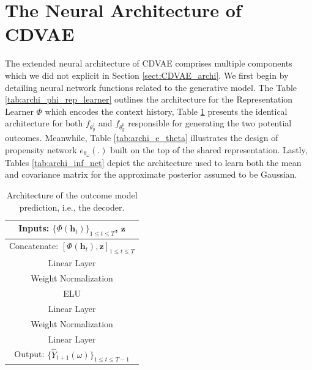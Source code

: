 \documentclass[10pt]{article} %
\begin{document}
\section{The Neural Architecture of CDVAE}
\label{appendix:extended_archi_CDVAE}
The extended neural architecture of CDVAE comprises multiple components which we did not explicit in Section \ref{sect:CDVAE_archi}. We first begin by detailing neural network functions related to the generative model. The Table \ref{tab:archi_phi_rep_learner} outlines the architecture for the Representation Learner $\Phi$ which encodes the context history, Table \ref{tab:archi_f_theta} presents the identical architecture for both $f_{\theta_{y}^1}$ and $f_{\theta_{y}^0}$ responsible for generating the two potential outcomes. Meanwhile, Table \ref{tab:archi_e_theta} illustrates the design of propensity network $e_{\theta_{\omega}}(.)$ built on the top of the shared representation. Lastly, Tables \ref{tab:archi_inf_net} depict the architecture used to learn both the mean and covariance matrix for the approximate posterior assumed to be Gaussian. 

\begin{table}[!htbp]
\centering
\begin{tabular}{|c|}
\hline Inputs: $\{\Phi(\mathbf{h}_t)\}_{ 1 \leq t \leq T}$, $\mathbf{z}$ \\
\hline Concatenate: $[\Phi(\mathbf{h}_t), \mathbf{z}]_{ 1 \leq t \leq T}$\\
\hline Linear Layer \\ 
\hline Weight Normalization \\
\hline ELU  \\
\hline Linear Layer \\
\hline Weight Normalization \\
\hline Linear Layer  \\
\hline Output: $\{\hat{Y}_{t+1}(\omega)\}_{ 1 \leq t \leq T-1}$ \\ 
\hline
 \end{tabular}
\caption{Architecture of the outcome model prediction, i.e., the decoder.}
\label{tab:archi_f_theta}
\end{table}
\end{document}
